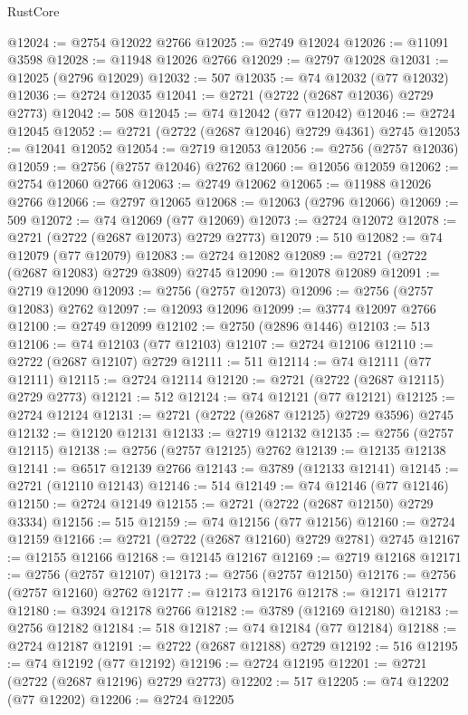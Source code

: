 \begin{lexlean}{RustCore}
\begin{coremodule}
@12024 := @2754 @12022 @2766
@12025 := @2749 @12024
@12026 := @11091 @3598
@12028 := @11948 @12026 @2766
@12029 := @2797 @12028
@12031 := @12025 (@2796 @12029)
@12032 := 507
@12035 := @74 @12032 (@77 @12032)
@12036 := @2724 @12035
@12041 := @2721 (@2722 (@2687 @12036) @2729 @2773)
@12042 := 508
@12045 := @74 @12042 (@77 @12042)
@12046 := @2724 @12045
@12052 := @2721 (@2722 (@2687 @12046) @2729 @4361) @2745
@12053 := @12041 @12052
@12054 := @2719 @12053
@12056 := @2756 (@2757 @12036)
@12059 := @2756 (@2757 @12046) @2762
@12060 := @12056 @12059
@12062 := @2754 @12060 @2766
@12063 := @2749 @12062
@12065 := @11988 @12026 @2766
@12066 := @2797 @12065
@12068 := @12063 (@2796 @12066)
@12069 := 509
@12072 := @74 @12069 (@77 @12069)
@12073 := @2724 @12072
@12078 := @2721 (@2722 (@2687 @12073) @2729 @2773)
@12079 := 510
@12082 := @74 @12079 (@77 @12079)
@12083 := @2724 @12082
@12089 := @2721 (@2722 (@2687 @12083) @2729 @3809) @2745
@12090 := @12078 @12089
@12091 := @2719 @12090
@12093 := @2756 (@2757 @12073)
@12096 := @2756 (@2757 @12083) @2762
@12097 := @12093 @12096
@12099 := @3774 @12097 @2766
@12100 := @2749 @12099
@12102 := @2750 (@2896 @1446)
@12103 := 513
@12106 := @74 @12103 (@77 @12103)
@12107 := @2724 @12106
@12110 := @2722 (@2687 @12107) @2729
@12111 := 511
@12114 := @74 @12111 (@77 @12111)
@12115 := @2724 @12114
@12120 := @2721 (@2722 (@2687 @12115) @2729 @2773)
@12121 := 512
@12124 := @74 @12121 (@77 @12121)
@12125 := @2724 @12124
@12131 := @2721 (@2722 (@2687 @12125) @2729 @3596) @2745
@12132 := @12120 @12131
@12133 := @2719 @12132
@12135 := @2756 (@2757 @12115)
@12138 := @2756 (@2757 @12125) @2762
@12139 := @12135 @12138
@12141 := @6517 @12139 @2766
@12143 := @3789 (@12133 @12141)
@12145 := @2721 (@12110 @12143)
@12146 := 514
@12149 := @74 @12146 (@77 @12146)
@12150 := @2724 @12149
@12155 := @2721 (@2722 (@2687 @12150) @2729 @3334)
@12156 := 515
@12159 := @74 @12156 (@77 @12156)
@12160 := @2724 @12159
@12166 := @2721 (@2722 (@2687 @12160) @2729 @2781) @2745
@12167 := @12155 @12166
@12168 := @12145 @12167
@12169 := @2719 @12168
@12171 := @2756 (@2757 @12107)
@12173 := @2756 (@2757 @12150)
@12176 := @2756 (@2757 @12160) @2762
@12177 := @12173 @12176
@12178 := @12171 @12177
@12180 := @3924 @12178 @2766
@12182 := @3789 (@12169 @12180)
@12183 := @2756 @12182
@12184 := 518
@12187 := @74 @12184 (@77 @12184)
@12188 := @2724 @12187
@12191 := @2722 (@2687 @12188) @2729
@12192 := 516
@12195 := @74 @12192 (@77 @12192)
@12196 := @2724 @12195
@12201 := @2721 (@2722 (@2687 @12196) @2729 @2773)
@12202 := 517
@12205 := @74 @12202 (@77 @12202)
@12206 := @2724 @12205

\end{coremodule}
\end{lexlean}
